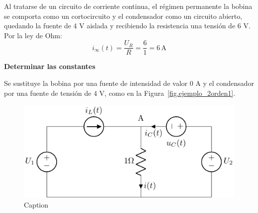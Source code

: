 \documentclass[11pt]{book} %
\begin{document}
\begin{example}
	    Al tratarse de un circuito de corriente continua, el régimen permanente la bobina se comporta como un cortocircuito y el condensador como un circuito abierto, quedando la fuente de 4 V aislada y recibiendo la resistencia una tensión de 6 V. Por la ley de Ohm:
	    \begin{equation*}
	        i_\infty(t)=\dfrac{U_R}{R}=\dfrac{6}{1}=6\,\text{A}
	    \end{equation*}
	    
	    \textbf{Determinar las constantes}
	    
	    Se sustituye la bobina por una fuente de intensidad de valor 0 A y el condensador por una fuente de tensión de 4 V, como en la Figura~\ref{fig.ejemplo_2orden1}.
	    \begin{figure}[H]
	        \centering
	        \includegraphics[width=0.45\linewidth]{../figs/ejemplo_2orden2.pdf}
	        \caption{Caption}
	        \label{fig.ejemplo_2orden2}
	    \end{figure}
	    

\end{example}
\end{document}
